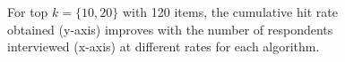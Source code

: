 \documentclass[nonblindrev]{informs3}
\newcommand{\eric}[1]{\textcolor{red}{\textbf{(eric)} #1}}
\newcommand{\fixedexpress}{\textbf{express}}
\newcommand{\egreedy}{$\epsilon$-\textbf{greedy}}
\newcommand{\egreedythres}{$\epsilon$-\textbf{greedythres}}
\newcommand{\ts}{\textbf{TS} }
\newcommand{\edts}{$\epsilon$-$\delta$-\textbf{diffuse TS} }
\newcommand{\tsthres}{\textbf{TS-thres} }
\newcommand{\edtsthres}{$\epsilon$-$\delta$-\textbf{TS-thres} }
\begin{document}
\begin{figure}%
    \caption{For top $k=\{10,20\}$ with 120 items, the cumulative hit rate obtained (y-axis) improves with the number of respondents interviewed (x-axis) at different rates for each algorithm.}%
    \label{fig:K120_L20_k3hit_k10hit}%
 	\begin{center}
    \qquad
	\end{center}
\end{figure}
\end{document}
